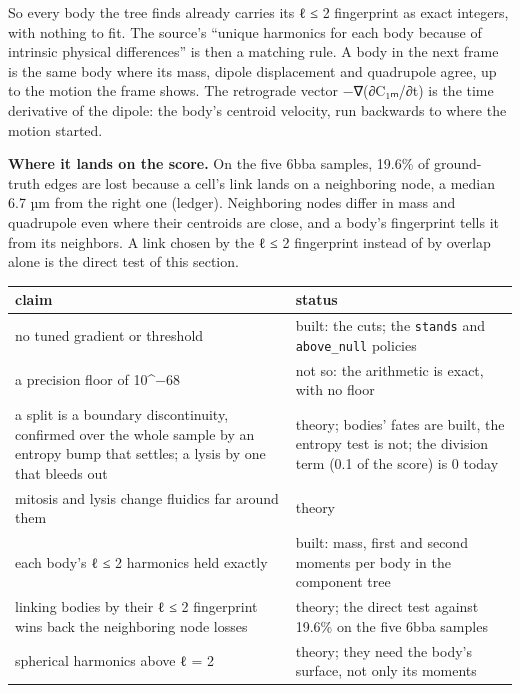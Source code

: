So every body the tree finds already carries its ℓ ≤ 2 fingerprint as exact integers, with nothing to fit. The source's “unique harmonics for each body because of intrinsic physical differences” is then a matching rule. A body in the next frame is the same body where its mass, dipole displacement and quadrupole agree, up to the motion the frame shows. The retrograde vector −∇(∂C₁ₘ/∂t) is the time derivative of the dipole: the body's centroid velocity, run backwards to where the motion started.

\textbf{Where it lands on the score.} On the five 6bba samples, 19.6\% of ground-truth edges are lost because a cell's link lands on a neighboring node, a median 6.7 µm from the right one (ledger). Neighboring nodes differ in mass and quadrupole even where their centroids are close, and a body's fingerprint tells it from its neighbors. A link chosen by the ℓ ≤ 2 fingerprint instead of by overlap alone is the direct test of this section.

{\small
\setlength{\tabcolsep}{6pt}
\begin{longtable}{>{\RaggedRight\arraybackslash}p{}>{\RaggedRight\arraybackslash}p{}}
\toprule
claim & status \\
\midrule
\endhead
no tuned gradient or threshold & built: the cuts; the \texttt{stands} and \texttt{above\_\allowbreak{}null} policies \\
a precision floor of 10\textasciicircum{}−68 & not so: the arithmetic is exact, with no floor \\
a split is a boundary discontinuity, confirmed over the whole sample by an entropy bump that settles; a lysis by one that bleeds out & theory; bodies' fates are built, the entropy test is not; the division term (0.1 of the score) is 0 today \\
mitosis and lysis change fluidics far around them & theory \\
each body's ℓ ≤ 2 harmonics held exactly & built: mass, first and second moments per body in the component tree \\
linking bodies by their ℓ ≤ 2 fingerprint wins back the neighboring node losses & theory; the direct test against 19.6\% on the five 6bba samples \\
spherical harmonics above ℓ = 2 & theory; they need the body's surface, not only its moments \\
\bottomrule
\end{longtable}
}

